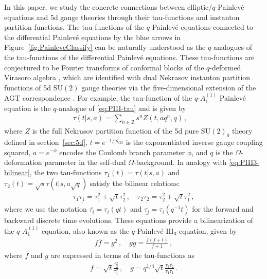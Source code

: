 \documentclass[11pt, a4paper]{article}
\theoremstyle{definition}
\begin{document}
In this paper, we study the concrete connections between elliptic/$ q $-Painlev\'e equations and 5d gauge theories through their tau-functions and instanton partition functions. The tau-functions of the $ q $-Painlev\'e equations connected to the differential Painlev\'e equations by the blue arrows in Figure~\ref{fig:PainleveClassify} can be naturally understood as the $ q $-analogues of the tau-functions of the differential Painlev\'e equations. These tau-functions are conjectured to be Fourier transforms of conformal blocks of the $ q $-deformed Virasoro algebra \cite{Bershtein:2016aef, Jimbo:2017ael}, which are identified with dual Nekrasov instanton partition functions of 5d $ \mathrm{SU}(2) $ gauge theories via the five-dimensional extension of the AGT correspondence \cite{Awata:2009ur}. For example, the tau-function of the $ q\text{-}A_1^{(1)} $ Painlev\'e equation is the $ q $-analogue of \eqref{eq:PIII-tau} and is given by \cite{Bershtein:2016aef, Matsuhira:2018qtx, Bonelli:2020dcp}
\begin{align}
    \tau(t | s, a) = \sum_{n\in \mathbb{Z}} s^n Z(t, aq^n, q) \, , \quad
\end{align}
where $ Z $ is the full Nekrasov partition function of the 5d pure $ \mathrm{SU}(2)_0 $ theory defined in section~\ref{sec:5d}, $ t=e^{-1/g_{\mathrm{YM}}^2} $ is the exponentiated inverse gauge coupling squared, $ a=e^{-\phi} $ encodes the Coulomb branch parameter $ \phi $, and $ q $ is the $ \Omega $-deformation parameter in the self-dual $ \Omega $-background. In analogy with \eqref{eq:PIII3-bilinear}, the two tau-functions $ \tau_1(t) = \tau(t|s,a) $ and $ \tau_2(t) = \sqrt{s}\tau(t|s,a\sqrt{q}) $ satisfy the bilinear relations:
\begin{align}\label{eq:qIII3-bilinear}
    \overline{\tau_1} \underline{\tau_1} = \tau_1^2 + \sqrt{t} \tau_2^2 \, , \quad
    \overline{\tau_2} \underline{\tau_2} = \tau_2^2 + \sqrt{t} \tau_1^2 \, ,
\end{align}
where we use the notation $ \overline{\tau_i} = \tau_i(qt) $ and $ \underline{\tau_i} = \tau_i(q^{-1}t) $ for the forward and backward discrete time evolutions. These equations provide a bilinearization of the $ q\text{-}A_1^{(1)} $ equation, also known as the $ q $-Painlev\'e $ \text{III}_3 $ equation, given by
\begin{align}
    f\overline{f} = g^2 \, , \quad
    g\underline{g} = \frac{f(f+t)}{f+1} \, ,
\end{align}
where $ f $ and $ g $ are expressed in terms of the tau-functions as
\begin{align}
    f = \sqrt{t} \frac{\tau_2^2}{\tau_1^2} \, , \quad
    g = q^{1/4} \sqrt{t} \frac{\tau_2 \overline{\tau_2}}{\tau_1 \overline{\tau_1}} \, .
\end{align}
\end{document}

